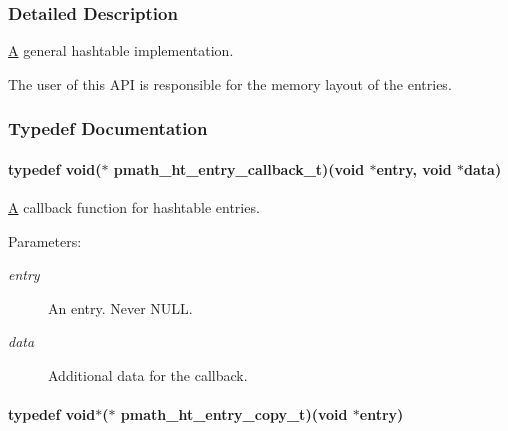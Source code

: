 \subsubsection{Detailed Description}
\hyperlink{class_a}{A} general hashtable implementation. 

The user of this API is responsible for the memory layout of the entries. 

\subsubsection{Typedef Documentation}
\hypertarget{group__hashtables_g49afb121d94e186dd0c129a7ac98af88}{
\paragraph[{pmath\_\-ht\_\-entry\_\-callback\_\-t}]{\setlength{\rightskip}{0pt plus 5cm}typedef void($\ast$ {\bf pmath\_\-ht\_\-entry\_\-callback\_\-t})(void $\ast$entry, void $\ast$data)}\hfill}
\label{group__hashtables_g49afb121d94e186dd0c129a7ac98af88}


\hyperlink{class_a}{A} callback function for hashtable entries. 

\begin{Desc}
\item[Parameters:]
\begin{description}
\item[{\em entry}]An entry. Never NULL. \item[{\em data}]Additional data for the callback. \end{description}
\end{Desc}
\hypertarget{group__hashtables_g7afcd0897350cdf6ea146196421d70f1}{
\paragraph[{pmath\_\-ht\_\-entry\_\-copy\_\-t}]{\setlength{\rightskip}{0pt plus 5cm}typedef void$\ast$($\ast$ {\bf pmath\_\-ht\_\-entry\_\-copy\_\-t})(void $\ast$entry)}\hfill}
\label{group__hashtables_g7afcd0897350cdf6ea146196421d70f1}


